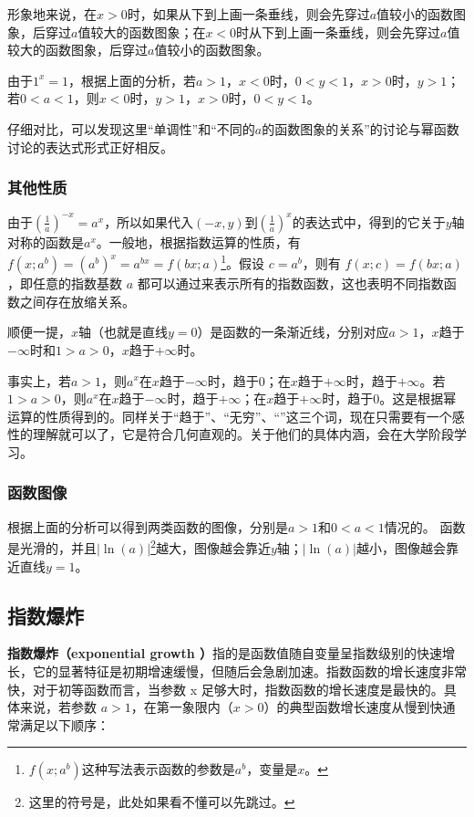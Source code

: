 形象地来说，在$x>0$时，如果从下到上画一条垂线，则会先穿过$a$值较小的函数图象，后穿过$a$值较大的函数图象；在$x<0$时从下到上画一条垂线，则会先穿过$a$值较大的函数图象，后穿过$a$值较小的函数图象。

由于$1^x=1$，根据上面的分析，若$a>1$，$x<0$时，$0<y<1$，$x>0$时，$y>1$；若$0<a<1$，则$x<0$时，$y>1$，$x>0$时，$0<y<1$。

仔细对比，可以发现这里“单调性”和“不同的$a$的函数图象的关系”的讨论与幂函数讨论的表达式形式正好相反。

\subsubsection{其他性质}

由于$\displaystyle \left(\frac{1}{a}\right)^{-x}=a^{x}$，所以如果代入$(-x,y)$到$\displaystyle\left(\frac{1}{a}\right)^{x}$的表达式中，得到的它关于$y$轴对称的函数是$a^{x}$。一般地，根据指数运算的性质，有$f(x;a^b)=\left(a^b\right)^x=a^{bx}=f(bx;a)$\footnote{$f(x;a^b)$这种写法表示函数的参数是$a^b$，变量是$x$。}。假设 $c = a^b$，则有 $f(x; c) = f(bx; a)$，即任意的指数基数 $a$ 都可以通过来表示所有的指数函数，这也表明不同指数函数之间存在放缩关系。

顺便一提，$x$轴（也就是直线$y=0$）是函数的一条渐近线，分别对应$a>1$，$x$趋于$-\infty$时和$1>a>0$，$x$趋于$+\infty$时。

事实上，若$a>1$，则$a^x$在$x$趋于$-\infty$时，趋于$0$；在$x$趋于$+\infty$时，趋于$+\infty$。若$1>a>0$，则$a^x$在$x$趋于$-\infty$时，趋于$+\infty$；在$x$趋于$+\infty$时，趋于$0$。这是根据幂运算的性质得到的。同样关于“趋于”、“无穷”、“”这三个词，现在只需要有一个感性的理解就可以了，它是符合几何直观的。关于他们的具体内涵，会在大学阶段学习。

\subsubsection{函数图像}

根据上面的分析可以得到两类函数的图像，分别是$a>1$和$0<a<1$情况的。
函数是光滑的，并且$|\ln(a)|$\footnote{这里的符号是，此处如果看不懂可以先跳过。}越大，图像越会靠近$y$轴；$|\ln(a)|$越小，图像越会靠近直线$y=1$。


\subsection{指数爆炸}

\textbf{指数爆炸（exponential growth ）}指的是函数值随自变量呈指数级别的快速增长，它的显著特征是初期增速缓慢，但随后会急剧加速。指数函数的增长速度非常快，对于初等函数而言，当参数 x 足够大时，指数函数的增长速度是最快的。具体来说，若参数 $a > 1$，在第一象限内（$x > 0$）的典型函数增长速度从慢到快通常满足以下顺序：

